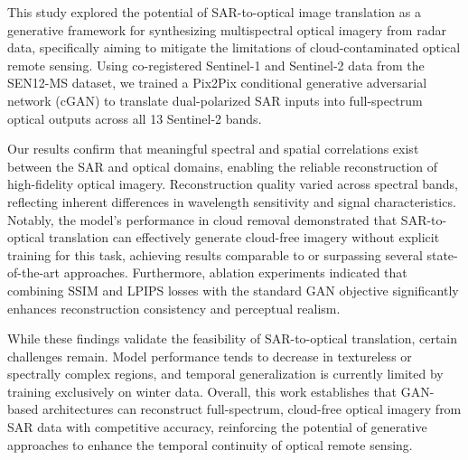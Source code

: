 \documentclass[remotesensing,article,submit,pdftex,moreauthors]{Definitions/mdpi}
\begin{document}
This study explored the potential of SAR-to-optical image translation as a generative framework for synthesizing multispectral optical imagery from radar data, specifically aiming to mitigate the limitations of cloud-contaminated optical remote sensing. Using co-registered Sentinel-1 and Sentinel-2 data from the SEN12-MS dataset, we trained a Pix2Pix conditional generative adversarial network (cGAN) to translate dual-polarized SAR inputs into full-spectrum optical outputs across all 13 Sentinel-2 bands.

Our results confirm that meaningful spectral and spatial correlations exist between the SAR and optical domains, enabling the reliable reconstruction of high-fidelity optical imagery. Reconstruction quality varied across spectral bands, reflecting inherent differences in wavelength sensitivity and signal characteristics. Notably, the model's performance in cloud removal demonstrated that SAR-to-optical translation can effectively generate cloud-free imagery without explicit training for this task, achieving results comparable to or surpassing several state-of-the-art approaches. Furthermore, ablation experiments indicated that combining SSIM and LPIPS losses with the standard GAN objective significantly enhances reconstruction consistency and perceptual realism.

While these findings validate the feasibility of SAR-to-optical translation, certain challenges remain. Model performance tends to decrease in textureless or spectrally complex regions, and temporal generalization is currently limited by training exclusively on winter data. Overall, this work establishes that GAN-based architectures can reconstruct full-spectrum, cloud-free optical imagery from SAR data with competitive accuracy, reinforcing the potential of generative approaches to enhance the temporal continuity of optical remote sensing.


\vspace{6pt} 


\end{document}
